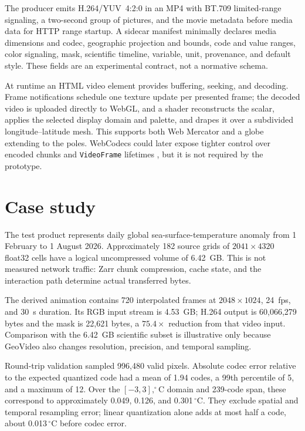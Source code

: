 \documentclass[11pt]{article}
\begin{document}
The producer emits H.264/YUV~4:2:0 in an MP4 with BT.709 limited-range signaling, a two-second group of pictures, and the movie metadata before media data for HTTP range startup. A sidecar manifest minimally declares media dimensions and codec, geographic projection and bounds, code and value ranges, color signaling, mask, scientific timeline, variable, unit, provenance, and default style. These fields are an experimental contract, not a normative schema.

At runtime an HTML video element provides buffering, seeking, and decoding. Frame notifications schedule one texture update per presented frame; the decoded video is uploaded directly to WebGL, and a shader reconstructs the scalar, applies the selected display domain and palette, and drapes it over a subdivided longitude--latitude mesh. This supports both Web Mercator and a globe extending to the poles. WebCodecs could later expose tighter control over encoded chunks and \texttt{VideoFrame} lifetimes \cite{webcodecs}, but it is not required by the prototype.

\section{Case study}
The test product represents daily global sea-surface-temperature anomaly from 1 February to 1 August 2026. Approximately 182 source grids of $2041\times4320$ float32 cells have a logical uncompressed volume of 6.42~GB. This is not measured network traffic: Zarr chunk compression, cache state, and the interaction path determine actual transferred bytes.

The derived animation contains 720 interpolated frames at $2048\times1024$, 24~fps, and 30~s duration. Its RGB input stream is 4.53~GB; H.264 output is 60,066,279 bytes and the mask is 22,621 bytes, a $75.4\times$ reduction from that video input. Comparison with the 6.42~GB scientific subset is illustrative only because GeoVideo also changes resolution, precision, and temporal sampling.

Round-trip validation sampled 996,480 valid pixels. Absolute codec error relative to the expected quantized code had a mean of 1.94 codes, a 99th percentile of 5, and a maximum of 12. Over the $[-3,3],^{\circ}$C domain and 239-code span, these correspond to approximately 0.049, 0.126, and 0.301$\,^{\circ}$C. They exclude spatial and temporal resampling error; linear quantization alone adds at most half a code, about 0.013$\,^{\circ}$C before codec error.
\end{document}
